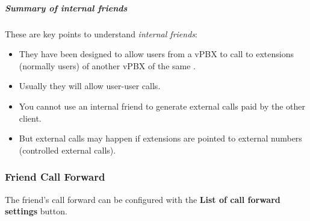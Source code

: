 \documentclass[letterpaper,10pt,spanish]{sphinxmanual}
\begin{document}
\subparagraph{Summary of internal friends}
\label{administration_portal/client/vpbx/routing_endpoints/friends/internal_friends:summary-of-internal-friends}
These are key points to understand \emph{internal friends}:
\begin{itemize}
\item {} 
They have been designed to allow users from a vPBX to call to extensions (normally users)
of another vPBX of the same {\hyperref[administration_portal/brand/settings/corporations:corporations]{}}.

\item {} 
Usually they will allow user-user calls.

\item {} 
You cannot use an internal friend to generate external calls paid by the other client.

\item {} 
But external calls may happen if extensions are pointed to external numbers (controlled external calls).

\end{itemize}


\subsubsection{Friend Call Forward}
\label{administration_portal/client/vpbx/routing_endpoints/friends/index:friend-call-forward}
The friend's call forward can be configured with the \textbf{List of call forward settings}  button.
\end{document}
